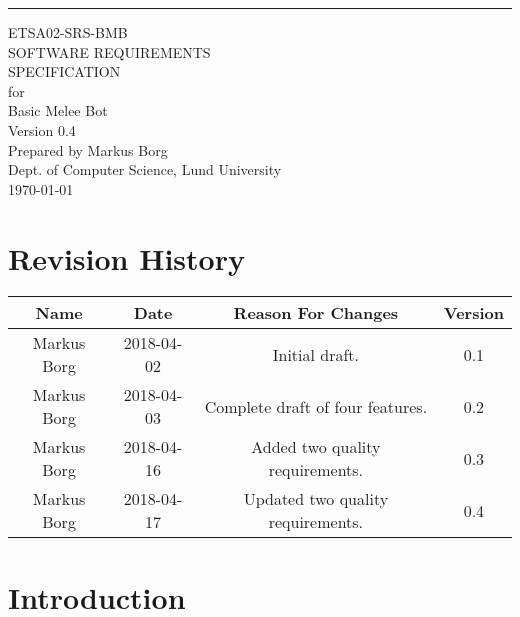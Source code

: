 \documentclass{scrreprt}
\date{}
\def\myversion{0.4 }
\begin{document}
\begin{flushright}
    \rule{16cm}{5pt}\vskip1cm
    \begin{bfseries}
    	\LARGE{ETSA02-SRS-BMB}\\
    	\vspace{1.5cm}
        \Huge{SOFTWARE REQUIREMENTS\\ SPECIFICATION}\\
        \vspace{0.5cm}
        for\\
        \vspace{0.5cm}
        Basic Melee Bot\\
        \vspace{1.5cm}
        \LARGE{Version \myversion}\\
        \vspace{1.5cm}
        Prepared by Markus Borg\\
        Dept. of Computer Science, Lund University\\
        \vspace{1.5cm}
        \today\\
    \end{bfseries}
\end{flushright}

\tableofcontents


\chapter*{Revision History}

\begin{center}
    \begin{tabular}{|c|c|c|c|}
        \hline
	    Name & Date & Reason For Changes & Version\\
        \hline
	    Markus Borg & 2018-04-02 & Initial draft. & 0.1\\
        \hline
        Markus Borg & 2018-04-03 & Complete draft of four features. & 0.2\\
        \hline
        Markus Borg & 2018-04-16 & Added two quality requirements. & 0.3\\
        \hline
        Markus Borg & 2018-04-17 & Updated two quality requirements. & 0.4\\
        \hline
    \end{tabular}
\end{center}

\chapter{Introduction}
\end{document}

